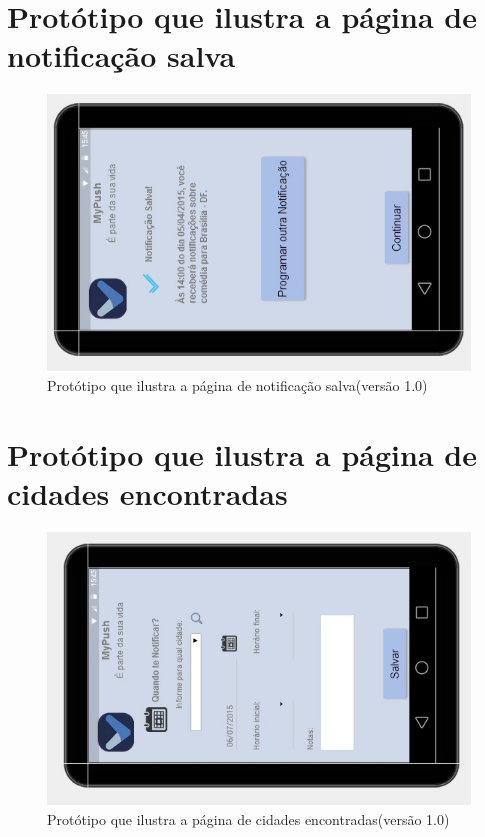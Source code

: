 \begin{apendicesenv}
    \pagebreak
      \section*{Protótipo que ilustra a página de notificação salva}

    \begin{figure}[!htbp]
      \centering
      \includegraphics[scale=0.9, angle=-90]{editaveis/figuras/prototipo_alta_fidelidade_v1/1_5}
      \caption{Protótipo que ilustra a página de notificação salva(versão 1.0)}
      \label{v1}
    \end{figure}
    
    \pagebreak
      \section*{Protótipo que ilustra a página de cidades encontradas}

    \begin{figure}[!htbp]
      \centering
      \includegraphics[scale=0.9, angle=-90]{editaveis/figuras/prototipo_alta_fidelidade_v1/1_6}
      \caption{Protótipo que ilustra a página de cidades encontradas(versão 1.0)}
      \label{v1}
    \end{figure}
    

\end{apendicesenv}
